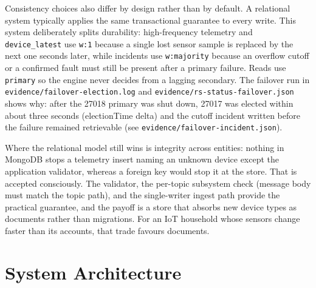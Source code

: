 \documentclass[11pt,a4paper]{article}
\begin{document}
Consistency choices also differ by design rather than by default. A relational system typically applies the same transactional guarantee to every write. This system deliberately splits durability: high-frequency telemetry and \texttt{device\_latest} use \texttt{w:1} because a single lost sensor sample is replaced by the next one seconds later, while incidents use \texttt{w:majority} because an overflow cutoff or a confirmed fault must still be present after a primary failure. Reads use \texttt{primary} so the engine never decides from a lagging secondary. The failover run in \texttt{evidence/failover-election.log} and \texttt{evidence/rs-status-failover.json} shows why: after the 27018 primary was shut down, 27017 was elected within about three seconds (electionTime delta) and the cutoff incident written before the failure remained retrievable (see \texttt{evidence/failover-incident.json}).

Where the relational model still wins is integrity across entities: nothing in MongoDB stops a telemetry insert naming an unknown device except the application validator, whereas a foreign key would stop it at the store. That is accepted consciously. The validator, the per-topic subsystem check (message body must match the topic path), and the single-writer ingest path provide the practical guarantee, and the payoff is a store that absorbs new device types as documents rather than migrations. For an IoT household whose sensors change faster than its accounts, that trade favours documents.

\section{System Architecture}
\end{document}
